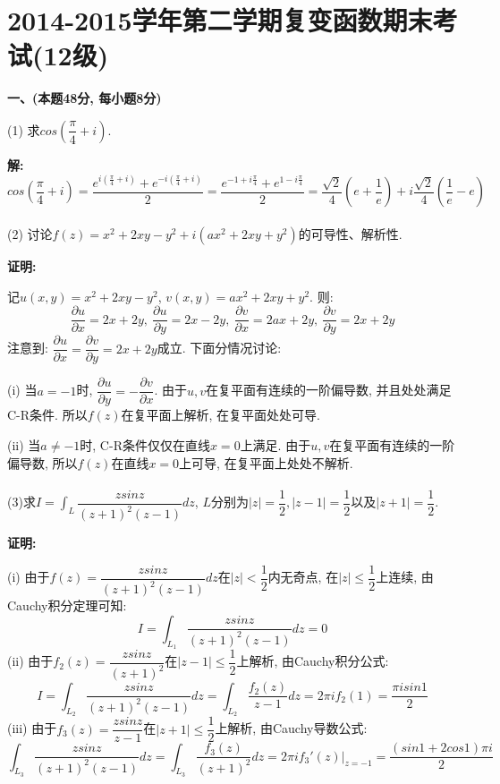 \documentclass{article}
\begin{document}
\newpage

\section{2014-2015学年第二学期复变函数期末考试(12级)}
\textbf{一、(本题48分, 每小题8分)}

(1) 求$cos(\dfrac{\pi}{4} + i)$.

\textbf{解:} 
$$ cos(\dfrac{\pi}{4}+i) = \dfrac{e^{i(\frac{\pi}{4} + i)} + e^{-i(\frac{\pi}{4} + i)}}{2} = \dfrac{e^{-1 + i\frac{\pi}{4}} + e^{1-i\frac{\pi}{4}}}{2} = \dfrac{\sqrt{2}}{4}(e + \dfrac{1}{e}) + i\dfrac{\sqrt{2}}{4} (\dfrac{1}{e} - e) $$ \\ 

(2) 讨论$f(z) = x^2 + 2xy - y^2 + i(ax^2 + 2xy + y^2)$的可导性、解析性. 

\textbf{证明:} 

记$u(x,y) = x^2 + 2xy - y^2$, $v(x,y) = ax^2 + 2xy + y^2$. 则:
$$ \dfrac{\partial u}{\partial x} = 2x + 2y, \ \dfrac{\partial u}{\partial y} = 2x - 2y, \ \dfrac{\partial v}{\partial x} = 2ax + 2y, \ \dfrac{\partial v}{\partial y} = 2x + 2y$$
注意到: $\dfrac{\partial u}{\partial x} = \dfrac{\partial v}{\partial y} = 2x + 2y$成立. 下面分情况讨论:

(i) 当$a =-1$时, $\dfrac{\partial u}{\partial y} = -\dfrac{\partial v}{\partial x}$. 由于$u,v$在复平面有连续的一阶偏导数, 并且处处满足C-R条件. 所以$f(z)$在复平面上解析, 在复平面处处可导. 

(ii) 当$a \neq -1$时, C-R条件仅仅在直线$x=0$上满足. 由于$u,v$在复平面有连续的一阶偏导数, 所以$f(z)$在直线$x=0$上可导, 在复平面上处处不解析. \\  \\  


(3)求$I = \displaystyle{\int_L \dfrac{zsinz}{(z+1)^2(z-1)}dz}$, $L$分别为$|z|=\dfrac{1}{2}, |z-1|=\dfrac{1}{2}$以及$|z+1|=\dfrac{1}{2}$. 

\textbf{证明:} 

(i) 由于$f(z) =\dfrac{zsinz}{(z+1)^2(z-1)}dz $在$|z|<\dfrac{1}{2}$内无奇点, 在$|z| \leq \dfrac{1}{2}$上连续, 由Cauchy积分定理可知:
$$ I = \displaystyle{\int_{L_1} \dfrac{zsinz}{(z+1)^2(z-1)}dz} = 0 $$
(ii) 由于$f_2(z) = \dfrac{zsinz}{(z+1)^2}$在$|z-1| \leq \dfrac{1}{2}$上解析, 由Cauchy积分公式:
$$ I = \displaystyle{\int_{L_2} \dfrac{zsinz}{(z+1)^2(z-1)}dz} = \displaystyle{\int_{L_2} \dfrac{f_2(z)}{z-1}dz} = 2\pi i f_2(1) = \dfrac{\pi i sin1}{2}$$
(iii) 由于$f_3(z) = \dfrac{zsinz}{z-1}$在$|z+1| \leq \dfrac{1}{2}$上解析, 由Cauchy导数公式:
$$ \displaystyle{\int_{L_3} \dfrac{zsinz}{(z+1)^2(z-1)}dz} = \displaystyle{\int_{L_3} \dfrac{f_3(z)}{(z+1)^2}dz} = 2\pi i f_3'(z)|_{z=-1} = \dfrac{\left(sin1 + 2cos1 \right)\pi i}{2} $$ \\ 
\end{document}
